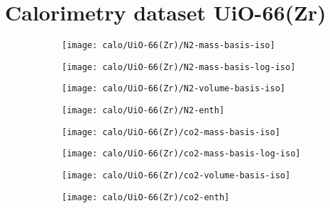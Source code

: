 
\section{Calorimetry dataset UiO-66(Zr)}

\begin{figure}[H]
    \centering

    \begin{subfigure}{0.25\linewidth}
        \texttt{[image: calo/UiO-66(Zr)/N2-mass-basis-iso]}%
        \label{appx:fgr:shaping:uio66n2mass}
    \end{subfigure}%
    \begin{subfigure}{0.25\linewidth}
        \texttt{[image: calo/UiO-66(Zr)/N2-mass-basis-log-iso]}%
        \label{appx:fgr:shaping:uio66n2masslog}
    \end{subfigure}%
    \begin{subfigure}{0.25\linewidth}
        \texttt{[image: calo/UiO-66(Zr)/N2-volume-basis-iso]}%
        \label{appx:fgr:shaping:uio66n2volume}
    \end{subfigure}%
    \begin{subfigure}{0.25\linewidth}
        \texttt{[image: calo/UiO-66(Zr)/N2-enth]}%
        \label{appx:fgr:shaping:uio66n2enth}%
    \end{subfigure}%

    \begin{subfigure}{0.25\textwidth}
        \texttt{[image: calo/UiO-66(Zr)/co2-mass-basis-iso]}%
        \label{appx:fgr:shaping:uio66co2mass}
    \end{subfigure}%
    \begin{subfigure}{0.25\textwidth}
        \texttt{[image: calo/UiO-66(Zr)/co2-mass-basis-log-iso]}%
        \label{appx:fgr:shaping:uio66co2masslog}
    \end{subfigure}%
    \begin{subfigure}{0.25\textwidth}
        \texttt{[image: calo/UiO-66(Zr)/co2-volume-basis-iso]}%
        \label{appx:fgr:shaping:uio66co2volume}
    \end{subfigure}%
    \begin{subfigure}{0.25\textwidth}
        \texttt{[image: calo/UiO-66(Zr)/co2-enth]}%
        \label{appx:fgr:shaping:uio66co2enth}%
    \end{subfigure}%


\end{figure}
